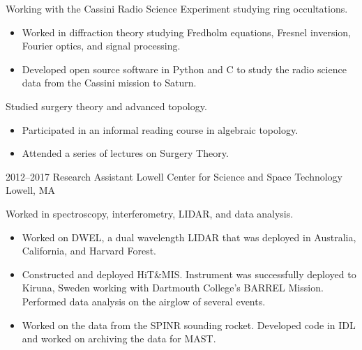 \documentclass[a4paper,sans]{moderncv}
\begin{document}
            {%
                Working with the Cassini Radio Science
                Experiment studying ring occultations.
                \begin{itemize}
                    \item
                        Worked in diffraction theory studying Fredholm
                        equations, Fresnel inversion, Fourier optics,
                        and signal processing.
                     \item
                        Developed open source software in Python and C to
                        study the radio science data from the Cassini mission to Saturn.
                 \end{itemize}
                 Studied surgery theory and advanced topology.
                 \begin{itemize}
                     \item
                        Participated in an informal reading
                        course in algebraic topology.
                     \item
                        Attended a series of lectures on Surgery Theory.
                 \end{itemize}%
             }
        \cventry%
            {2012--2017}
            {Research Assistant}
            {Lowell Center for Science and Space Technology}
            {Lowell, MA}
            {}
            {%
                Worked in spectroscopy, interferometry,
                LIDAR, and data analysis.
                \begin{itemize}
                    \item
                        Worked on DWEL, a dual wavelength LIDAR that was
                        deployed in Australia, California, and Harvard Forest.
                    \item
                        Constructed and deployed HiT\&MIS.
                        Instrument was successfully deployed to Kiruna,
                        Sweden working with Dartmouth College's BARREL
                        Mission. Performed data analysis on the airglow of
                        several events.
                    \item
                        Worked on the data from the SPINR sounding rocket.
                        Developed code in IDL and worked on archiving the
                        data for MAST.
                \end{itemize}%
             }
        \cventry%
\end{document}
